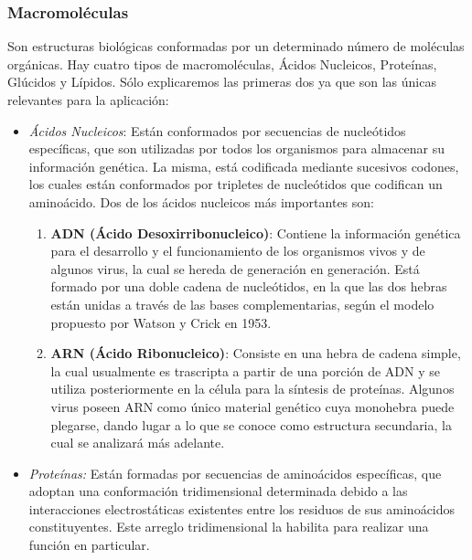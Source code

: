   \subsubsection{Macromol\'eculas}
  Son estructuras biol\'ogicas conformadas por un determinado n\'umero de mol\'eculas org\'anicas. Hay cuatro tipos de macromol\'eculas, \'Acidos Nucleicos, Prote\'inas, 
  Gl\'ucidos y L\'ipidos. S\'olo explicaremos las primeras dos ya que son las \'unicas relevantes para la aplicaci\'on:
  \begin{itemize}
    \item \emph{\'Acidos Nucleicos}: Est\'an conformados por secuencias de nucle\'otidos espec\'ificas, que son utilizadas por todos los organismos para almacenar su informaci\'on gen\'etica. La misma, est\'a codificada mediante sucesivos codones, los cuales est\'an conformados por tripletes de nucle\'otidos que codifican un amino\'acido. Dos de los \'acidos nucleicos m\'as importantes son:
      \begin{enumerate}
        \item \textbf{ADN (\'Acido Desoxirribonucleico)}: Contiene la informaci\'on gen\'etica para el desarrollo y el funcionamiento de los organismos vivos
	  y de algunos virus, la cual se hereda de generaci\'on en generaci\'on. Est\'a formado por una doble cadena de nucle\'otidos, en la que las dos hebras est\'an unidas a trav\'es de las bases complementarias, seg\'un el modelo propuesto por Watson y Crick en 1953.
        \item \textbf{ARN (\'Acido Ribonucleico)}: Consiste en una hebra de cadena simple, la cual usualmente es trascripta a partir de una porci\'on de ADN y se utiliza posteriormente en la c\'elula para la s\'intesis de prote\'inas. Algunos virus poseen ARN como \'unico material gen\'etico cuya monohebra puede plegarse, dando lugar a lo que se conoce como estructura secundaria, la cual se analizar\'a m\'as adelante.
      \end{enumerate}

    \item \emph{Prote\'inas:}
      Est\'an formadas por secuencias de amino\'acidos espec\'ificas, que adoptan una conformaci\'on tridimensional determinada debido a las interacciones electrost\'aticas existentes entre los residuos de sus amino\'acidos constituyentes. Este arreglo tridimensional la habilita para realizar una funci\'on en particular.
  \end{itemize}

